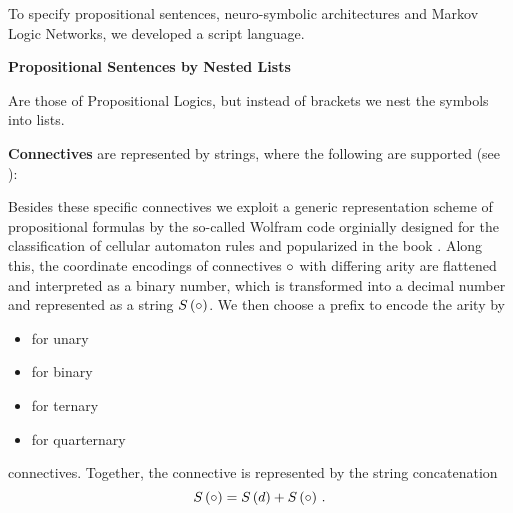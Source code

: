 \label{subsec:scriptLanguage}

To specify propositional sentences, neuro-symbolic architectures and Markov Logic Networks, we developed a script language.

\textbf{Propositional Sentences by Nested Lists}

Are those of Propositional Logics, but instead of brackets we nest the symbols into lists.

\textbf{Connectives} are represented by strings, where the following are supported (see ):
\begin{center}
\end{center}

Besides these specific connectives we exploit a generic representation scheme of propositional formulas by the so-called Wolfram code orginially designed for the classification of cellular automaton rules \cite{wolfram_statistical_1983} and popularized in the book \cite{wolfram_new_2002}.
Along this, the coordinate encodings of connectives $\circ$ with differing arity are flattened and interpreted as a binary number, which is transformed into a decimal number and represented as a string $S\left(\circ\right)$.
We then choose a prefix to encode the arity by
\begin{itemize}
	\item {} for unary
	\item {} for binary
	\item {} for ternary
	\item {} for quarternary
\end{itemize}
connectives.
Together, the connective is represented by the string concatenation
	\[  S\left(\circ\right) = S\left(d\right) + S\left(\circ\right) \, . \]


